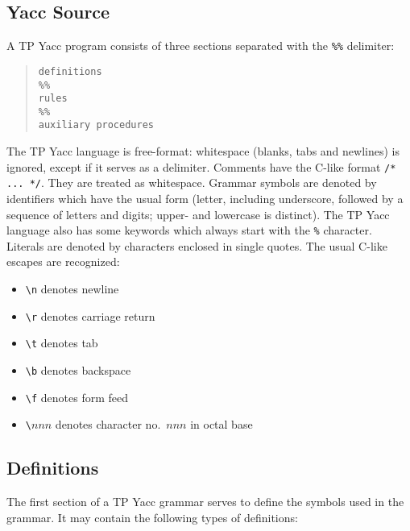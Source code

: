 \subsection{Yacc Source}

A TP Yacc program consists of three sections separated with the \verb"%%"
delimiter:

\begin{quote}\begin{verbatim}
definitions
%%
rules
%%
auxiliary procedures
\end{verbatim}\end{quote}

The TP Yacc language is free-format: whitespace (blanks, tabs and newlines)
is ignored, except if it serves as a delimiter. Comments have the C-like
format \verb"/* ... */". They are treated as whitespace. Grammar symbols are
denoted by identifiers which have the usual form (letter, including
underscore, followed by a sequence of letters and digits; upper- and
lowercase is distinct). The TP Yacc language also has some keywords which
always start with the \verb"%" character. Literals are denoted by characters
enclosed in single quotes. The usual C-like escapes are recognized:

\begin{itemize}
   \item \verb"\n"     denotes newline
   \item \verb"\r"     denotes carriage return
   \item \verb"\t"     denotes tab
   \item \verb"\b"     denotes backspace
   \item \verb"\f"     denotes form feed
   \item \verb"\"$nnn$ denotes character no.\ $nnn$ in octal base
\end{itemize}

\subsection{Definitions}

The first section of a TP Yacc grammar serves to define the symbols used in
the grammar. It may contain the following types of definitions:

